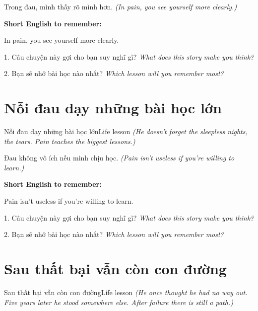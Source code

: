 \begin{baihoc}
Trong đau, mình thấy rõ mình hơn.
\textit{(In pain, you see yourself more clearly.)}
\end{baihoc}

\begin{ghinhoanh}
\textbf{Short English to remember:}

In pain, you see yourself more clearly.

\end{ghinhoanh}

\begin{tuhocnhanh}
1. Câu chuyện này gợi cho bạn suy nghĩ gì? \textit{What does this story make you think?}

2. Bạn sẽ nhớ bài học nào nhất? \textit{Which lesson will you remember most?}
\end{tuhocnhanh}
\ngancach


\section{Nỗi đau dạy những bài học lớn}
\begin{truyen}{Nỗi đau dạy những bài học lớn}{Life lesson}
\textit{(He doesn't forget the sleepless nights, the tears. Pain teaches the biggest lessons.)}
\end{truyen}

\begin{baihoc}
Đau không vô ích nếu mình chịu học.
\textit{(Pain isn't useless if you're willing to learn.)}
\end{baihoc}

\begin{ghinhoanh}
\textbf{Short English to remember:}

Pain isn't useless if you're willing to learn.

\end{ghinhoanh}

\begin{tuhocnhanh}
1. Câu chuyện này gợi cho bạn suy nghĩ gì? \textit{What does this story make you think?}

2. Bạn sẽ nhớ bài học nào nhất? \textit{Which lesson will you remember most?}
\end{tuhocnhanh}
\ngancach


\section{Sau thất bại vẫn còn con đường}
\begin{truyen}{Sau thất bại vẫn còn con đường}{Life lesson}
\textit{(He once thought he had no way out. Five years later he stood somewhere else. After failure there is still a path.)}
\end{truyen}

